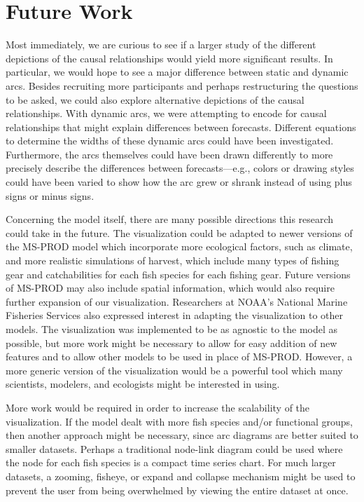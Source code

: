\section{Future Work}

Most immediately, we are curious to see if a larger study of the different depictions of the causal relationships would yield more significant results.  In particular, we would hope to see a major difference between static and dynamic arcs.  Besides recruiting more participants and perhaps restructuring the questions to be asked, we could also explore alternative depictions of the causal relationships.  With dynamic arcs, we were attempting to encode for causal relationships that might explain differences between forecasts.  Different equations to determine the widths of these dynamic arcs could have been investigated.  Furthermore, the arcs themselves could have been drawn differently to more precisely describe the differences between forecasts---e.g., colors or drawing styles could have been varied to show how the arc grew or shrank instead of using plus signs or minus signs.

Concerning the model itself, there are many possible directions this research could take in the future.  The visualization could be adapted to newer versions of the MS-PROD model which incorporate more ecological factors, such as climate, and more realistic simulations of harvest, which include many types of fishing gear and catchabilities for each fish species for each fishing gear.  Future versions of MS-PROD may also include spatial information, which would also require further expansion of our visualization.  Researchers at NOAA's National Marine Fisheries Services also expressed interest in adapting the visualization to other models.  The visualization was implemented to be as agnostic to the model as possible, but more work might be necessary to allow for easy addition of new features and to allow other models to be used in place of MS-PROD.  However, a more generic version of the visualization would be a powerful tool which many scientists, modelers, and ecologists might be interested in using.

More work would be required in order to increase the scalability of the visualization.  If the model dealt with more fish species and/or functional groups, then another approach might be necessary, since arc diagrams are better suited to smaller datasets.  Perhaps a traditional node-link diagram could be used where the node for each fish species is a compact time series chart.  For much larger datasets, a zooming, fisheye, or expand and collapse mechanism might be used to prevent the user from being overwhelmed by viewing the entire dataset at once.

